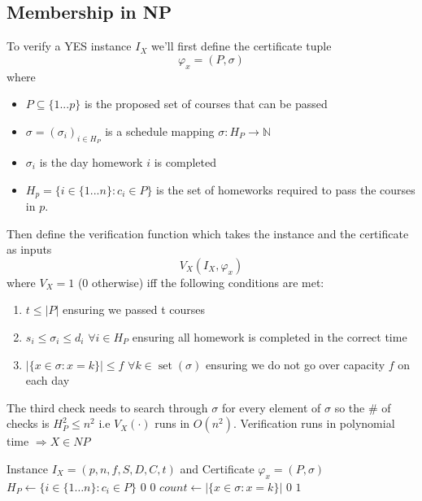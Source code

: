 \documentclass[11pt]{article}
\begin{document}
\subsection{Membership in NP}
To verify a YES instance $I_X$ we'll first define the certificate tuple $$\varphi_x = (P,\sigma)$$ where
\begin{itemize}
    \item $P \subseteq \{1...p\}$ is the proposed set of courses that can be passed 
    \item $\sigma = (\sigma_i)_{i\in H_P}$ is a schedule mapping $\sigma : H_P \rightarrow \mathbb{N}$ 
    \item $\sigma_i$ is the day homework $i$ is completed 
    \item $H_p = \{i\in\{1...n\} : c_i\in P\}$ is the set of homeworks required to pass the courses in $p$.
\end{itemize}
Then define the verification function which takes the instance and the certificate as inputs $$V_X(I_X,\varphi_x)$$
where $V_X = 1$ (0 otherwise) iff the following conditions are met: 
\begin{enumerate}
    \item $t \leq |P|$ ensuring we passed t courses
    \item $s_i \leq \sigma_i \leq d_i$ $\forall i \in H_P$ ensuring all homework is completed in the correct time
    \item $|\{x \in \sigma : x = k \}| \leq f$ $\forall k\in \operatorname{set}(\sigma)$ ensuring we 
        do not go over capacity $f$ on each day
\end{enumerate}
The third check needs to search through $\sigma$ for every element of $\sigma$ so the \# of checks is $H_P^2 \leq n^2$ 
i.e $V_X(\cdot)$ runs in $O(n^2)$. Verification runs in polynomial time $\Rightarrow X \in NP$
\begin{algorithm}
\caption{Verification Algorithm $V_X(I_X, \varphi_x)$}
\begin{algorithmic}[1]
\Require Instance $I_X = (p, n, f, S, D, C, t)$ and Certificate $\varphi_x = (P, \sigma)$
\State $H_P \gets \{i \in \{1 \dots n\} : c_i \in P\}$
    \State \Return $0$ %
\EndIf
{}
        \State \Return $0$ %
    \EndIf
\EndFor
{}
    \State $count \gets |\{x \in \sigma : x = k\}|$
        \State \Return $0$ %
    \EndIf
\EndFor
\State \Return $1$ %
\end{algorithmic}
\end{algorithm}
\end{document}
